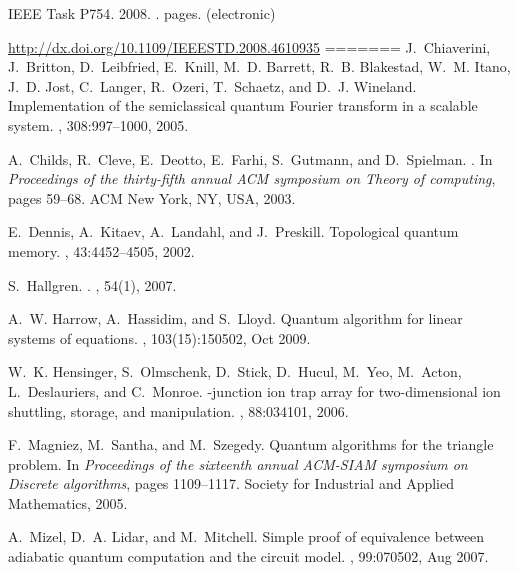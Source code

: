 \documentclass{article}
\begin{document}
\begin{itemize}
\begin{thebibliography}{10}
{{IEEE Task P754}}. 2008.
.
 pages.
\newblock
 (electronic)

\url{http://dx.doi.org/10.1109/IEEESTD.2008.4610935}
=======
J.~Chiaverini, J.~Britton, D.~Leibfried, E.~Knill, M.~D. Barrett, R.~B.
  Blakestad, W.~M. Itano, J.~D. Jost, C.~Langer, R.~Ozeri, T.~Schaetz, and
  D.~J. Wineland.
\newblock Implementation of the semiclassical quantum {Fourier} transform in a
  scalable system.
, 308:997--1000, 2005.

A.~Childs, R.~Cleve, E.~Deotto, E.~Farhi, S.~Gutmann, and D.~Spielman.
.
\newblock In {\em Proceedings of the thirty-fifth annual ACM symposium on
  Theory of computing}, pages 59--68. ACM New York, NY, USA, 2003.

E.~Dennis, A.~Kitaev, A.~Landahl, and J.~Preskill.
\newblock Topological quantum memory.
, 43:4452--4505, 2002.

S.~Hallgren.
.
, 54(1), 2007.

A.~W. Harrow, A.~Hassidim, and S.~Lloyd.
\newblock Quantum algorithm for linear systems of equations.
, 103(15):150502, Oct 2009.

W.~K. Hensinger, S.~Olmschenk, D.~Stick, D.~Hucul, M.~Yeo, M.~Acton,
  L.~Deslauriers, and C.~Monroe.
-junction ion trap array for two-dimensional ion shuttling,
  storage, and manipulation.
, 88:034101, 2006.

F.~Magniez, M.~Santha, and M.~Szegedy.
\newblock Quantum algorithms for the triangle problem.
\newblock In {\em Proceedings of the sixteenth annual ACM-SIAM symposium on
  Discrete algorithms}, pages 1109--1117. Society for Industrial and Applied
  Mathematics, 2005.

A.~Mizel, D.~A. Lidar, and M.~Mitchell.
\newblock Simple proof of equivalence between adiabatic quantum computation and
  the circuit model.
, 99:070502, Aug 2007.


\end{thebibliography}
\end{itemize}
\end{document}
